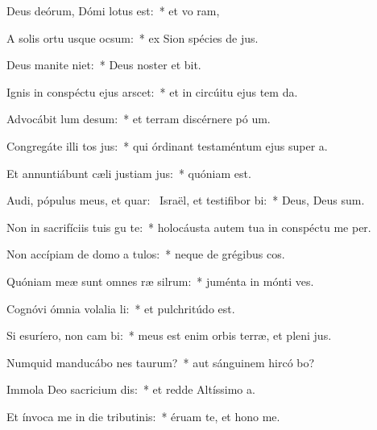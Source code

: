 \item Deus deórum, Dómi lotus est:~* et vo ram,
\item A solis ortu usque  ocsum:~* ex Sion spécies de jus.
\item Deus manite niet:~* Deus noster et  bit.
\item Ignis in conspéctu ejus arscet:~* et in circúitu ejus tem da.
\item Advocábit lum desum:~* et terram discérnere pó um.
\item Congregáte illi tos jus:~* qui órdinant testaméntum ejus super a.
\item Et annuntiábunt cæli justiam jus:~* quóniam   est.
\item Audi, pópulus meus, et quar:~\pscross{} Israël, et testifibor bi:~* Deus, Deus   sum.
\item Non in sacrifíciis tuis gu te:~* holocáusta autem tua in conspéctu me  per.
\item Non accípiam de domo a tulos:~* neque de grégibus  cos.
\item Quóniam meæ sunt omnes ræ silrum:~* juménta in mónti  ves.
\item Cognóvi ómnia volalia li:~* et pulchritúdo   est.
\item Si esuríero, non cam bi:~* meus est enim orbis terræ, et pleni jus.
\item Numquid manducábo nes taurum?~* aut sánguinem hircó bo?
\item Immola Deo sacricium dis:~* et redde Altíssimo  a.
\item Et ínvoca me in die tributinis:~* éruam te, et hono me.
